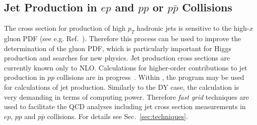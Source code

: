 




\subsection{Jet Production in $ep$ and $pp$ or $p \bar p$ Collisions}
\label{jetsection}

The cross section for production of high $p_T$ hadronic jets
is sensitive to the high-$x$ gluon 
PDF (see e.g. Ref.~\cite{MSTWpdf}). 
Therefore this process can be used to improve the determination of the gluon PDF,
which is particularly important for Higgs production and searches for new physics.
Jet production cross sections are currently known only to NLO.
Calculations for higher-order contributions to jet production in $pp$ collisions
are in progress~\cite{nigel:2013,nigel:2010,Currie:2013dwa}. 
Within \fitter, the \nlojetpp program \cite{Nagy:1998bb,Nagy:2001fj} may be used for 
calculations of jet production.
Similarly to the DY case, the calculation 
is very demanding in terms of computing power. 
Therefore \emph{fast grid} techniques are used  
to facilitate the QCD analyses including jet cross section measurements
in $ep$, $pp$ and $p\bar{p}$ collisions.
For details see Sec.~\ref{sec:techniques}.


